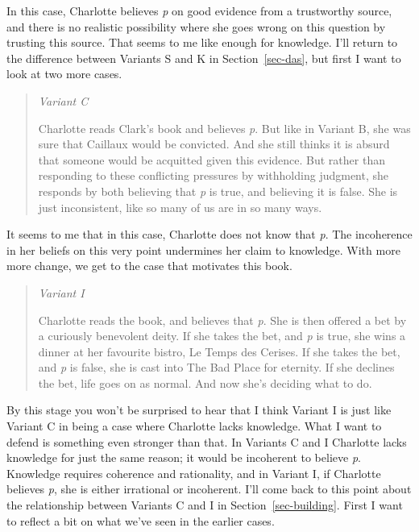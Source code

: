 \documentclass[
  12pt,
  letterpaper,
]{scrbook}
\begin{document}
In this case, Charlotte believes \emph{p} on good evidence from a
trustworthy source, and there is no realistic possibility where she goes
wrong on this question by trusting this source. That seems to me like
enough for knowledge. I'll return to the difference between Variants S
and K in Section~\ref{sec-das}, but first I want to look at two more
cases.

\begin{quote}
\emph{Variant C}

Charlotte reads Clark's book and believes \emph{p}. But like in Variant
B, she was sure that Caillaux would be convicted. And she still thinks
it is absurd that someone would be acquitted given this evidence. But
rather than responding to these conflicting pressures by withholding
judgment, she responds by both believing that \emph{p} is true, and
believing it is false. She is just inconsistent, like so many of us are
in so many ways.
\end{quote}

It seems to me that in this case, Charlotte does not know that \emph{p}.
The incoherence in her beliefs on this very point undermines her claim
to knowledge. With more more change, we get to the case that motivates
this book.

\begin{quote}
\emph{Variant I}

Charlotte reads the book, and believes that \emph{p}. She is then
offered a bet by a curiously benevolent deity. If she takes the bet, and
\emph{p} is true, she wins a dinner at her favourite bistro, Le Temps
des Cerises. If she takes the bet, and \emph{p} is false, she is cast
into The Bad Place for eternity. If she declines the bet, life goes on
as normal. And now she's deciding what to do.
\end{quote}

By this stage you won't be surprised to hear that I think Variant I is
just like Variant C in being a case where Charlotte lacks knowledge.
What I want to defend is something even stronger than that. In Variants
C and I Charlotte lacks knowledge for just the same reason; it would be
incoherent to believe \emph{p}. Knowledge requires coherence and
rationality, and in Variant I, if Charlotte believes \emph{p}, she is
either irrational or incoherent. I'll come back to this point about the
relationship between Variants C and I in Section~\ref{sec-building}.
First I want to reflect a bit on what we've seen in the earlier cases.
\end{document}
